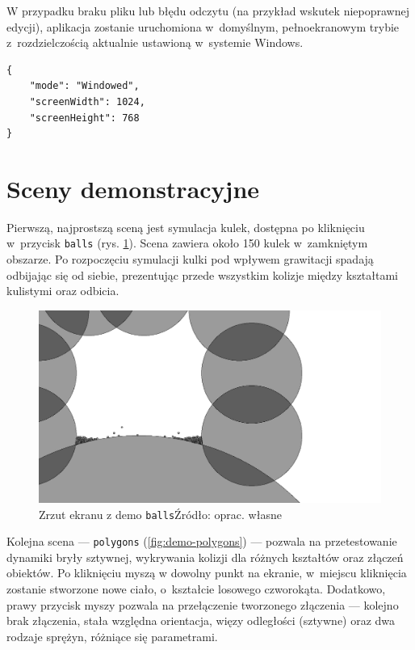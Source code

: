 W przypadku braku pliku lub błędu odczytu (na przykład wskutek niepoprawnej edycji), aplikacja zostanie uruchomiona w~domyślnym, pełnoekranowym trybie z~rozdzielczością aktualnie ustawioną w~systemie Windows.
\clearpage
\begin{lstlisting}[label={lst:configfile},caption={Przykładowa treść pliku konfiguracyjnego}]
{
	"mode": "Windowed",
	"screenWidth": 1024,
	"screenHeight": 768
}
\end{lstlisting}

\section{Sceny demonstracyjne}

Pierwszą, najprostszą sceną jest symulacja kulek, dostępna po kliknięciu w~przycisk \texttt{balls} (rys. \ref{fig:demo-balls}). Scena zawiera około 150 kulek w~zamkniętym obszarze. Po rozpoczęciu symulacji kulki pod wpływem grawitacji spadają odbijając się od siebie, prezentując przede wszystkim kolizje między kształtami kulistymi oraz odbicia. 

\begin{figure}[h]
	\centering
	\includegraphics[width=0.9\linewidth]{images/screenshot-balls}
	\caption[Zrzut ekranu z demo \texttt{balls}]{Zrzut ekranu z demo \texttt{balls}\newline Źródło: oprac. własne}
	\label{fig:demo-balls}
\end{figure}


Kolejna scena --- \texttt{polygons} (\ref{fig:demo-polygons}) --- pozwala na przetestowanie dynamiki bryły sztywnej, wykrywania kolizji dla różnych kształtów oraz złączeń obiektów. Po kliknięciu myszą w dowolny punkt na ekranie, w~miejscu kliknięcia zostanie stworzone nowe ciało, o~kształcie losowego czworokąta. Dodatkowo, prawy przycisk myszy pozwala na przełączenie tworzonego złączenia --- kolejno brak złączenia, stała względna orientacja, więzy odległości (sztywne) oraz dwa rodzaje sprężyn, różniące się parametrami. 

